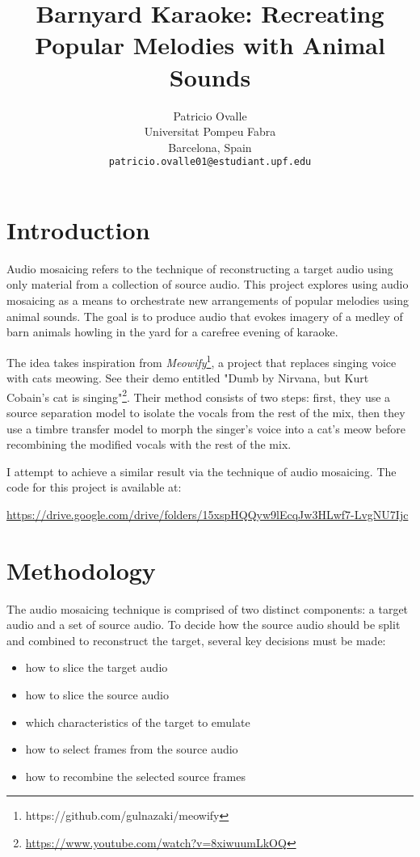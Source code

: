 \documentclass{article}
\title{Barnyard Karaoke: Recreating Popular Melodies with Animal Sounds}
\date{}
\author{
	Patricio Ovalle \\
	Universitat Pompeu Fabra\\
	Barcelona, Spain \\
	\texttt{patricio.ovalle01@estudiant.upf.edu}
}
\begin{document}
\maketitle



\section{Introduction}

Audio mosaicing refers to the technique of reconstructing a target audio using only material from a collection of source audio. This project explores using audio mosaicing as a means to orchestrate new arrangements of popular melodies using animal sounds. The goal is to produce audio that evokes imagery of a medley of barn animals howling in the yard for a carefree evening of karaoke.

The idea takes inspiration from \textit{Meowify}\footnote{https://github.com/gulnazaki/meowify}, a project that replaces singing voice with cats meowing. See their demo entitled "Dumb by Nirvana, but Kurt Cobain's cat is singing"\footnote{\url{https://www.youtube.com/watch?v=8xiwuumLkOQ}}. Their method consists of two steps: first, they use a source separation model to isolate the vocals from the rest of the mix, then they use a timbre transfer model to morph the singer's voice into a cat's meow before recombining the modified vocals with the rest of the mix.

I attempt to achieve a similar result via the technique of audio mosaicing. The code for this project is available at:
	\begin{center}
		\url{https://drive.google.com/drive/folders/15xspHQQyw9lEcqJw3HLwf7-LvgNU7Ijc}
	\end{center}


\section{Methodology}

The audio mosaicing technique is comprised of two distinct components: a target audio and a set of source audio. To decide how the source audio should be split and combined to reconstruct the target, several key decisions must be made:

\begin{itemize}
  \item how to slice the target audio
  \item how to slice the source audio
  \item which characteristics of the target to emulate
  \item how to select frames from the source audio
  \item how to recombine the selected source frames
\end{itemize}
\end{document}
